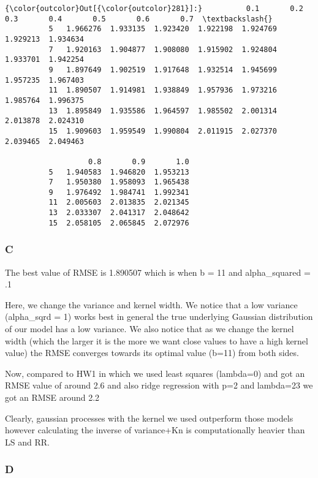 \documentclass[11pt]{article}
\begin{document}
\begin{Verbatim}[commandchars=\\\{\}]
{\color{outcolor}Out[{\color{outcolor}281}]:}          0.1       0.2       0.3       0.4       0.5       0.6       0.7  \textbackslash{}
          5   1.966276  1.933135  1.923420  1.922198  1.924769  1.929213  1.934634   
          7   1.920163  1.904877  1.908080  1.915902  1.924804  1.933701  1.942254   
          9   1.897649  1.902519  1.917648  1.932514  1.945699  1.957235  1.967403   
          11  1.890507  1.914981  1.938849  1.957936  1.973216  1.985764  1.996375   
          13  1.895849  1.935586  1.964597  1.985502  2.001314  2.013878  2.024310   
          15  1.909603  1.959549  1.990804  2.011915  2.027370  2.039465  2.049463   
          
                   0.8       0.9       1.0  
          5   1.940583  1.946820  1.953213  
          7   1.950380  1.958093  1.965438  
          9   1.976492  1.984741  1.992341  
          11  2.005603  2.013835  2.021345  
          13  2.033307  2.041317  2.048642  
          15  2.058105  2.065845  2.072976  
\end{Verbatim}
            
    \subsubsection{C}\label{c}

The best value of RMSE is 1.890507 which is when b = 11 and
alpha\_squared = .1

Here, we change the variance and kernel width. We notice that a low
variance (alpha\_sqrd = 1) works best in general the true underlying
Gaussian distribution of our model has a low variance. We also notice
that as we change the kernel width (which the larger it is the more we
want close values to have a high kernel value) the RMSE converges
towards its optimal value (b=11) from both sides.

Now, compared to HW1 in which we used least squares (lambda=0) and got
an RMSE value of around 2.6 and also ridge regression with p=2 and
lambda=23 we got an RMSE around 2.2

Clearly, gaussian processes with the kernel we used outperform those
models however calculating the inverse of variance+Kn is computationally
heavier than LS and RR.

    \subsubsection{D}\label{d}
\end{document}
